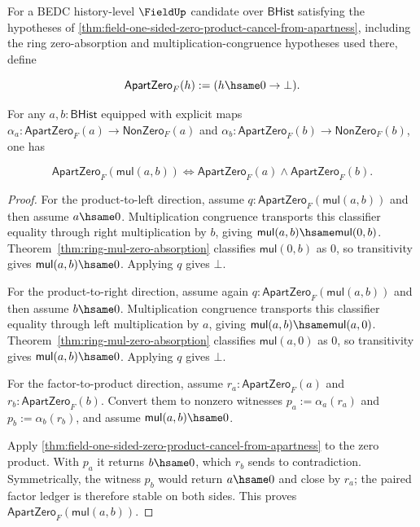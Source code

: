 \begin{theorem}
\label{thm:field-binary-product-apartzero-exact}
For a BEDC history-level $\FieldUp$ candidate over $\mathsf{BHist}$
satisfying the hypotheses of
\autoref{thm:field-one-sided-zero-product-cancel-from-apartness}, including
the ring zero-absorption and multiplication-congruence hypotheses used
there, define

$$
\mathsf{ApartZero}_F(h) := (h\hsame0\to\bot).
$$

For any $a,b:\mathsf{BHist}$ equipped with explicit maps
$\alpha_a:\mathsf{ApartZero}_F(a)\to\mathsf{NonZero}_F(a)$ and
$\alpha_b:\mathsf{ApartZero}_F(b)\to\mathsf{NonZero}_F(b)$, one has

$$
\mathsf{ApartZero}_F(\mathsf{mul}(a,b))
\Longleftrightarrow
\mathsf{ApartZero}_F(a)\land\mathsf{ApartZero}_F(b).
$$
\end{theorem}
\begin{proof}
For the product-to-left direction, assume
$q:\mathsf{ApartZero}_F(\mathsf{mul}(a,b))$ and then assume $a\hsame0$.
Multiplication congruence transports this classifier equality through right
multiplication by $b$, giving
$\mathsf{mul}(a,b)\hsame\mathsf{mul}(0,b)$. Theorem~\ref{thm:ring-mul-zero-absorption}
classifies $\mathsf{mul}(0,b)$ as $0$, so transitivity gives
$\mathsf{mul}(a,b)\hsame0$. Applying $q$ gives $\bot$.

For the product-to-right direction, assume again
$q:\mathsf{ApartZero}_F(\mathsf{mul}(a,b))$ and then assume $b\hsame0$.
Multiplication congruence transports this classifier equality through left
multiplication by $a$, giving
$\mathsf{mul}(a,b)\hsame\mathsf{mul}(a,0)$. Theorem~\ref{thm:ring-mul-zero-absorption}
classifies $\mathsf{mul}(a,0)$ as $0$, so transitivity gives
$\mathsf{mul}(a,b)\hsame0$. Applying $q$ gives $\bot$.

For the factor-to-product direction, assume
$r_a:\mathsf{ApartZero}_F(a)$ and $r_b:\mathsf{ApartZero}_F(b)$. Convert them
to nonzero witnesses $p_a:=\alpha_a(r_a)$ and $p_b:=\alpha_b(r_b)$, and
assume $\mathsf{mul}(a,b)\hsame0$.

Apply \autoref{thm:field-one-sided-zero-product-cancel-from-apartness} to the
zero product. With $p_a$ it returns $b\hsame0$, which $r_b$ sends to
contradiction. Symmetrically, the witness $p_b$ would return $a\hsame0$ and
close by $r_a$; the paired factor ledger is therefore stable on both sides.
This proves $\mathsf{ApartZero}_F(\mathsf{mul}(a,b))$.
\end{proof}

